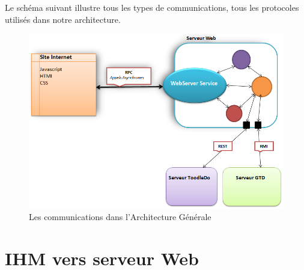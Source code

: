 Le schéma suivant illustre tous les types de communications, tous les protocoles utilisés dans notre architecture.

\begin{figure}[H]
\begin{center}
\includegraphics[scale=0.7]{commDansArchi.png}
\caption{Les communications dans l'Architecture Générale}
\end{center}
\end{figure}

\chapter{IHM vers serveur Web}

